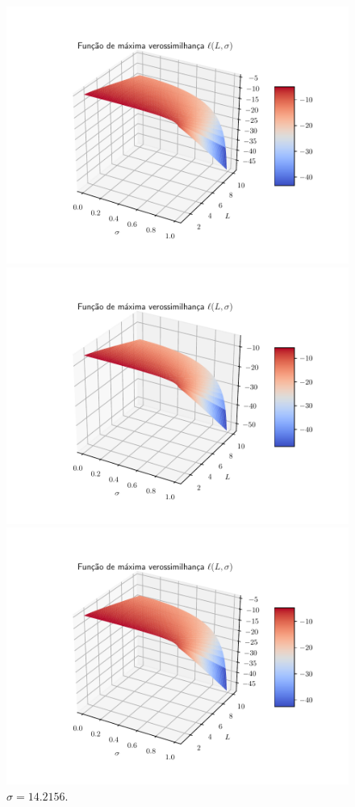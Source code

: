 \documentclass[journal,article,submit,moreauthors,pdftex]{Definitions/mdpi}
\begin{document}
\begin{figure}[hbt]
  \includegraphics[width=\linewidth]{funv_max_ver_j_50_flev_razao.pdf}
  	\caption{$\sigma=10.4523$.}\label{cap_acf_fig04}
\endminipage\hfill
{}
  \includegraphics[width=\linewidth]{funv_max_ver_j_60_flev_razao.pdf}
		\caption{$\sigma= 14.2156$.}\label{cap_acf_fig05}
\endminipage\hfill
\centering
{}
  \includegraphics[width=\linewidth]{funv_max_ver_j_70_flev_razao.pdf}

\end{figure}
\end{document}
